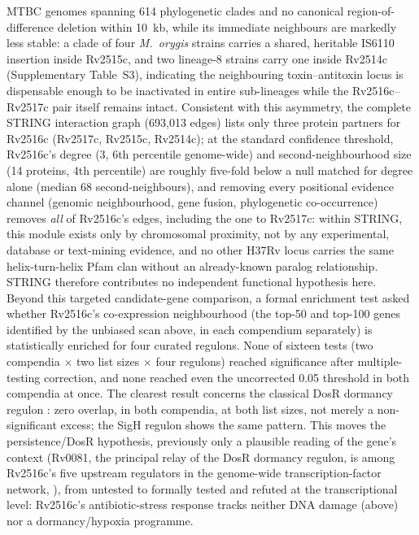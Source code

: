 \documentclass[11pt,a4paper]{article}
\begin{document}
MTBC genomes spanning 614 phylogenetic clades and no canonical region-of-difference deletion within
10~kb, while its immediate neighbours are markedly less stable: a clade of four \textit{M.\ orygis}
strains carries a shared, heritable IS6110 insertion inside Rv2515c, and two lineage-8 strains carry
one inside Rv2514c (Supplementary Table~S3), indicating the neighbouring toxin--antitoxin locus is dispensable enough to be
inactivated in entire sub-lineages while the Rv2516c--Rv2517c pair itself remains intact. Consistent
with this
asymmetry, the complete STRING interaction graph (693{,}013 edges) lists only three protein partners
for Rv2516c (Rv2517c, Rv2515c, Rv2514c); at the standard confidence threshold, Rv2516c's degree (3,
6th percentile genome-wide) and second-neighbourhood size (14 proteins, 4th percentile) are roughly
five-fold below a null matched for degree alone (median 68 second-neighbours), and removing every
positional evidence channel (genomic neighbourhood, gene fusion, phylogenetic co-occurrence) removes
\emph{all} of Rv2516c's edges, including the one to Rv2517c: within STRING, this module exists only
by chromosomal proximity, not by any experimental, database or text-mining evidence, and no other
H37Rv locus carries the same helix-turn-helix Pfam clan without an already-known paralog
relationship. STRING therefore contributes no independent functional hypothesis here. Beyond this
targeted candidate-gene comparison, a formal enrichment test asked whether Rv2516c's co-expression
neighbourhood (the top-50 and top-100 genes identified by the unbiased scan above, in each
compendium separately) is statistically enriched for four curated regulons. None of sixteen tests
(two compendia $\times$ two list sizes $\times$ four regulons) reached significance after
multiple-testing correction, and none reached even the uncorrected 0.05 threshold in both compendia
at once. The clearest result concerns the classical DosR dormancy regulon
\citep{rustad2008dosr}: zero overlap, in both compendia, at both list sizes, not merely a
non-significant excess; the SigH regulon shows the same pattern. This moves the persistence/DosR
hypothesis, previously only a plausible reading of the gene's context (Rv0081, the principal relay
of the DosR dormancy regulon, is among Rv2516c's five upstream regulators in the genome-wide
transcription-factor network, \citep{minch2015network}), from untested to formally tested and
refuted at the transcriptional level: Rv2516c's antibiotic-stress response tracks neither DNA
damage (above) nor a dormancy/hypoxia programme.
\end{document}
